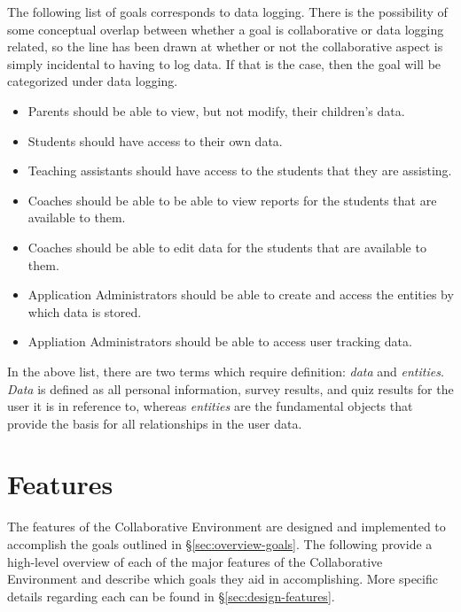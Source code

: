The following list of goals corresponds to data logging. There is the possibility of some conceptual overlap between whether a goal is collaborative or data logging related, so the line has been drawn at whether or not the collaborative aspect is simply incidental to having to log data. If that is the case, then the goal will be categorized under data logging.

\begin{itemize}
\item Parents should be able to view, but not modify, their children's data.
\item Students should have access to their own data.
\item Teaching assistants should have access to the students that they are assisting.
\item Coaches should be able to be able to view reports for the students that are available to them.
\item Coaches should be able to edit data for the students that are available to them.
\item Application Administrators should be able to create and access the entities by which data is stored.
\item Appliation Administrators should be able to access user tracking data.
\end{itemize}

In the above list, there are two terms which require definition: \emph{data} and \emph{entities}. \emph{Data} is defined as all personal information, survey results, and quiz results for the user it is in reference to, whereas \emph{entities} are the fundamental objects that provide the basis for all relationships in the user data.


\section{Features}
\label{sec:overview-features}
The features of the Collaborative Environment are designed and implemented to accomplish the goals outlined in \S \ref{sec:overview-goals}. The following provide a high-level overview of each of the major features of the Collaborative Environment and describe which goals they aid in accomplishing. More specific details regarding each can be found in \S \ref{sec:design-features}.

